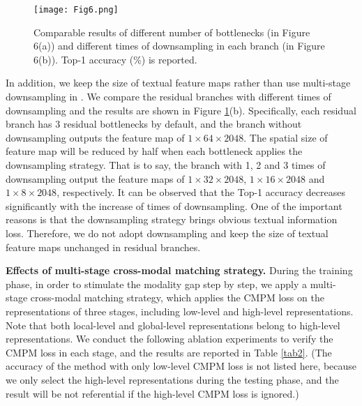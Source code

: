 \documentclass[review]{elsarticle}
\begin{document}
\begin{figure}[!t]
\centering
\texttt{[image: Fig6.png]}\\
\caption{Comparable results of different number of bottlenecks (in Figure 6(a)) and different times of downsampling in each branch (in Figure 6(b)). Top-1 accuracy (\%) is reported.}
\label{fig6}
\end{figure}


In addition, we keep the size of textual feature maps rather than use multi-stage downsampling in \cite{12}. We compare the residual branches with different times of downsampling and the results are shown in Figure \ref{fig6}(b). Specifically, each residual branch has 3 residual bottlenecks by default, and the branch without downsampling outputs the feature map of $1 \times 64 \times 2048$. The spatial size of feature map will be reduced by half when each bottleneck applies the downsampling strategy. That is to say, the branch with 1, 2 and 3 times of downsampling output the feature maps of $1 \times 32 \times 2048$, $1 \times 16 \times 2048$ and $1 \times 8 \times 2048$, respectively. It can be observed that the Top-1 accuracy decreases significantly with the increase of times of downsampling. One of the important reasons is that the downsampling strategy brings obvious textual information loss. Therefore, we do not adopt downsampling and keep the size of textual feature maps unchanged in residual branches.

\textbf{Effects of multi-stage cross-modal matching strategy.} During the training phase, in order to stimulate the modality gap step by step, we apply a multi-stage cross-modal matching strategy, which applies the CMPM loss on the representations of three stages, including low-level and high-level representations. Note that both local-level and global-level representations belong to high-level representations. We conduct the following ablation experiments to verify the CMPM loss in each stage, and the results are reported in Table \ref{tab2}. (The accuracy of the method with only low-level CMPM loss is not listed here, because we only select the high-level representations during the testing phase, and the result will be not referential if the high-level CMPM loss is ignored.)
\end{document}
